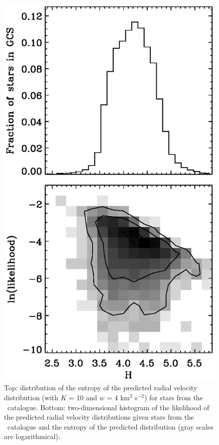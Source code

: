 \clearpage
\begin{figure}
\includegraphics{hist_gcs_ent.ps}
\caption{Top: distribution of the entropy of the predicted radial velocity distribution (with $K$ = 10 and $w$ = 4 km$^2$ s$^{-2}$) for stars from the \gcsabb\ catalogue. Bottom: two-dimensional histogram of the likelihood of the predicted radial velocity distributions given stars from the \gcsabb\ catalogue and the entropy of the predicted distribution (gray scales are logarithmical).}%
\label{fig:hist_gcs_ent}
\end{figure}



